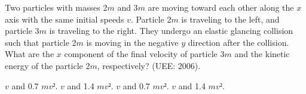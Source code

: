 \documentclass[12pt,addpoints]{exam}
\begin{document}
\begin{questions}
\begin{choices}
					\end{choices}

					\question Two particles with masses 2$m$ and 3$m$ 
                   are moving toward each other along the $x$ axis with the 
                   same initial speeds $v$. Particle 2$m$ is traveling to 
                   the left, and particle 3$m$ is traveling to the right. 
                   They undergo an elastic glancing collision such that 
                   particle 2$m$ is moving in the negative $y$ direction 
                   after the collision. What are the $x$ component of the 
                   final velocity of particle 3$m$ and the kinetic energy of 
                   the particle 2$m$, respectively? (UEE: 2006).\\
					\begin{choices}
						 $v$ and 0.7 $mv²$.
						 $v$ and 1.4 $mv²$.
						 $v$ and 0.7 $mv²$.
						 $v$ and 1.4 $mv²$.
						
					\end{choices}
				\end{questions}
			
\end{document}
